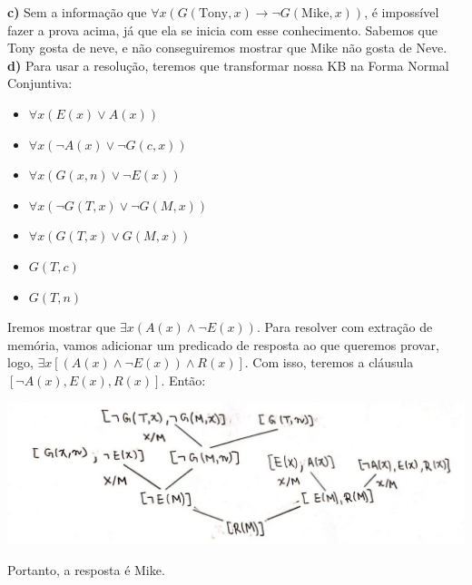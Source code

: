 \documentclass[12pt,letterpaper]{article}
\begin{document}
	\textbf{c)} Sem a informação que $\forall x (G(\text{Tony},x)\to\lnot G(\text{Mike},x))$, é impossível fazer a prova acima, já que ela se inicia com esse conhecimento. Sabemos que Tony gosta de neve, e não conseguiremos mostrar que Mike não gosta de Neve. \\
	
	\textbf{d)} Para usar a resolução, teremos que transformar nossa KB na Forma Normal Conjuntiva:
	
	\begin{multicols}{2}
		\begin{itemize}
			\item $\forall x (E(x)\lor A(x))$
			\item $\forall x (\lnot A(x)\lor \lnot G(c,x))$
			\item $\forall x ( G(x,n)\lor\lnot E(x))$
			\item $\forall x (\lnot G(T,x)\lor\lnot  G(M,x))$
			\item $\forall x (G(T,x)\lor G(M,x))$
			\item $G(T,c)$
			\item $G(T,n)$
		\end{itemize}
	\end{multicols}
	
	Iremos mostrar que $\exists x (A(x) \land \lnot E(x))$. Para resolver com extração de memória, vamos adicionar um predicado de resposta ao que queremos provar, logo, $\exists x [(A(x) \land \lnot E(x)) \land R(x)]$. Com isso, teremos a cláusula $[\lnot A(x), E(x), R(x)]$. Então:
	
	\includegraphics[width=\textwidth]{2d.jpg}
	
	Portanto, a resposta é Mike.
			 
\end{document}
